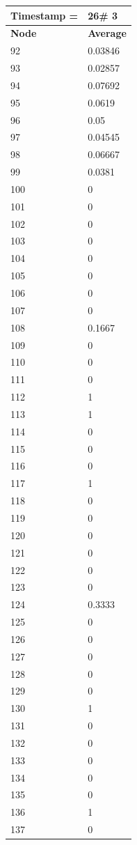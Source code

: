 \begin{tabular}{|l||l|}
\hline
\textbf{Timestamp =} & \textbf{26}\# 3\\\hline
	\textbf{Node} & \textbf{Average} \\ \hline
\hline
	92 & 0.03846 \\ \hline
	93 & 0.02857 \\ \hline
	94 & 0.07692 \\ \hline
	95 & 0.0619 \\ \hline
	96 & 0.05 \\ \hline
	97 & 0.04545 \\ \hline
	98 & 0.06667 \\ \hline
	99 & 0.0381 \\ \hline
	100 & 0 \\ \hline
	101 & 0 \\ \hline
	102 & 0 \\ \hline
	103 & 0 \\ \hline
	104 & 0 \\ \hline
	105 & 0 \\ \hline
	106 & 0 \\ \hline
	107 & 0 \\ \hline
	108 & 0.1667 \\ \hline
	109 & 0 \\ \hline
	110 & 0 \\ \hline
	111 & 0 \\ \hline
	112 & 1 \\ \hline
	113 & 1 \\ \hline
	114 & 0 \\ \hline
	115 & 0 \\ \hline
	116 & 0 \\ \hline
	117 & 1 \\ \hline
	118 & 0 \\ \hline
	119 & 0 \\ \hline
	120 & 0 \\ \hline
	121 & 0 \\ \hline
	122 & 0 \\ \hline
	123 & 0 \\ \hline
	124 & 0.3333 \\ \hline
	125 & 0 \\ \hline
	126 & 0 \\ \hline
	127 & 0 \\ \hline
	128 & 0 \\ \hline
	129 & 0 \\ \hline
	130 & 1 \\ \hline
	131 & 0 \\ \hline
	132 & 0 \\ \hline
	133 & 0 \\ \hline
	134 & 0 \\ \hline
	135 & 0 \\ \hline
	136 & 1 \\ \hline
	137 & 0 \\ \hline
\end{tabular}

